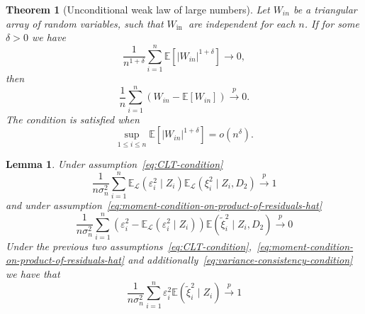 \documentclass[12pt]{article}
\newtheorem{theorem}{Theorem}
\newtheorem{lemma}{Lemma}
\theoremstyle{definition}
\theoremstyle{remark}
\newcommand{\E}{\mathbb E}								%
\newcommand{\srz}{Z}									%
\newcommand{\law}{\mathcal L}							%
\begin{document}
\begin{theorem}[Unconditional weak law of large numbers]\label{thm:unconditional-wlln}
	Let $W_{i n}$ be a triangular array of random variables, such that $W_{\text {in }}$ are independent for each $n$. If for some $\delta>0$ we have
	$$
	\frac{1}{n^{1+\delta}} \sum_{i=1}^n \mathbb{E}\left[\left|W_{i n}\right|^{1+\delta}\right] \rightarrow 0,
	$$
	then
	$$
	\frac{1}{n} \sum_{i=1}^n\left(W_{i n}-\mathbb{E}\left[W_{i n}\right]\right) \stackrel{p}{\rightarrow} 0 .
	$$
	The condition is satisfied when
	$$
	\sup _{1 \leq i \leq n} \mathbb{E}\left[\left|W_{i n}\right|^{1+\delta}\right]=o\left(n^\delta\right) .
	$$
\end{theorem}
\begin{lemma}\label{lemma:variance-of-the-resampled-statistic-converges}
	Under assumption~\eqref{eq:CLT-condition}
	\begin{equation}\label{eq:variance-A}
		\frac{1}{n\sigma_n^2} \sum_{i=1}^n \E_\law(\varepsilon^2_i \mid \srz_i) \E_\law(\xi_i^2 \mid \srz_i, D_2) \overset{p}{\to} 1 
	\end{equation}
	and under assumption~\eqref{eq:moment-condition-on-product-of-residuals-hat}
	\begin{equation}\label{eq:variance-B}
		\frac{1}{n\sigma_n^2} \sum_{i=1}^n \left(\varepsilon_i^2 - \E_\law(\varepsilon_i^2 \mid \srz_i) \right)\E(\widetilde\xi_i^2 \mid \srz_i,D_2) \overset{p}{\to} 0
	\end{equation}
	Under the previous two assumptions~\eqref{eq:CLT-condition},~\eqref{eq:moment-condition-on-product-of-residuals-hat} and additionally~\eqref{eq:variance-consistency-condition} we have that
	\begin{equation}\label{eq:resampling-variance-is-consistent}
		\frac{1}{n\sigma_n^2} \sum_{i=1}^n \varepsilon_i^2 \E( \widetilde\xi^2_i \mid \srz_i) \overset{p}{\to} 1 
	\end{equation}
\end{lemma}
\end{document}
